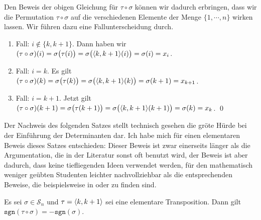 \proof
Den Beweis der obigen Gleichung f\"ur $\tau \circ \sigma$ k\"onnen
wir dadurch erbringen, dass wir die Permutation $\tau \circ \sigma$ auf die verschiedenen Elemente der
Menge $\{1,\cdots,n\}$ wirken lassen.  Wir f\"uhren dazu eine Fallunterscheidung durch.
\begin{enumerate}
\item Fall: $i \not\in \{k,k+1\}$. Dann haben wir
      \\[0.2cm]
      \hspace*{1.3cm}
      $(\tau \circ \sigma)(i) = \sigma\bigl(\tau(i)\bigr) = \sigma\bigl(\pair(k,k+1)(i)\bigr) = \sigma(i) = x_i$.
\item Fall: $i = k$.  Es gilt
      \\[0.2cm] 
      \hspace*{1.3cm}
      $(\tau \circ \sigma)(k) = \sigma\bigl(\tau(k)\bigr) = \sigma\bigl(\pair(k,k+1)(k)\bigr) = \sigma(k+1) = x_{k+1}$.
\item Fall: $i = k+1$.  Jetzt gilt
      \\[0.2cm] 
      \hspace*{1.3cm}
      $(\tau \circ \sigma)(k+1) = \sigma\bigl(\tau(k+1)\bigr) = \sigma\bigl(\pair(k,k+1)(k+1)\bigr) = \sigma(k) = x_k$.
      \qed
\end{enumerate}

Der Nachweis des folgenden Satzes stellt technisch gesehen die gr\"o\3te H\"urde bei der Einf\"uhrung der
Determinanten dar.  Ich habe mich f\"ur einen elementaren Beweis dieses Satzes entschieden: Dieser
Beweis ist zwar einerseits l\"anger als die Argumentation, die in der Literatur sonst oft benutzt wird,
der Beweis ist aber dadurch, dass keine tiefliegenden Ideen verwendet werden, f\"ur den mathematisch
weniger ge\"ubten Studenten leichter nachvollziehbar als die entsprechenden Beweise, die beispielsweise in
\cite{fischer:2008} oder \cite{kowalsky:2003} zu finden sind.

\begin{Satz}
  Es sei $\sigma \in \mathcal{S}_n$ und $\tau = \pair(k, k + 1)$ sei eine elementare Transposition.  Dann gilt
  \\[0.2cm]
  \hspace*{1.3cm}
  $\mathtt{sgn}(\tau \circ \sigma) = - \mathtt{sgn}(\sigma)$.
\end{Satz}


